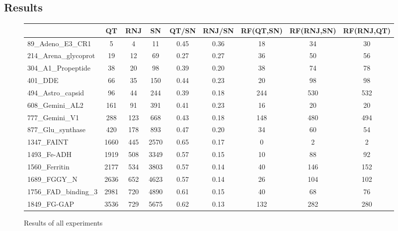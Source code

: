 \documentclass[a4paper,oneside,article,11pt]{memoir}
\begin{document}
\subsection*{Results }
\begin{figure}[H]
\begin{adjustwidth}{-2.3cm}{}
\begin{tabular}{l|c|c|c|c|c|c|c|c}
						& QT 	& RNJ 	& SN		& QT/SN 		& RNJ/SN & RF(QT,SN)	& RF(RNJ,SN) & RF(RNJ,QT) 	\\\hline
89\_Adeno\_E3\_CR1 		& 5 		& 4 		& 11   	& 0.45	 	& 0.36	 & 18		& 34			 & 30 			\\\hline
214\_Arena\_glycoprot 	& 19 	& 12 	& 69   	& 0.27 		& 0.27	 & 36		& 50			 & 56 			\\\hline
304\_A1\_Propeptide 		& 38 	& 20 	& 98   	& 0.39 		& 0.20	 & 38		& 74			 & 78 			\\\hline
401\_DDE 				& 66 	& 35 	& 150  	& 0.44 		& 0.23	 & 20		& 98			 & 98 			\\\hline
494\_Astro\_capsid 		& 96 	& 44 	& 244  	& 0.39 		& 0.18	 & 244		& 530		 & 532 			\\\hline
608\_Gemini\_AL2 		& 161 	& 91 	& 391  	& 0.41	 	& 0.23	 & 16		& 20			 & 20 			\\\hline
777\_Gemini\_V1 			& 288 	& 123 	& 668  	& 0.43 		& 0.18	 & 148		& 480		 & 494 			\\\hline
877\_Glu\_synthase 		& 420 	& 178 	& 893  	& 0.47 		& 0.20	 & 34		& 60			 & 54 			\\\hline
1347\_FAINT 				& 1660 	& 445	& 2570 	& 0.65 		& 0.17	 & 0			& 2			 & 2 			\\\hline
1493\_Fe-ADH 			& 1919 	& 508 	& 3349 	& 0.57 		& 0.15	 & 10		& 88			 & 92 			\\\hline
1560\_Ferritin 			& 2177 	& 534 	& 3803 	& 0.57 		& 0.14	 & 40		& 146		 & 152 			\\\hline
1689\_FGGY\_N 			& 2636 	& 652 	& 4623 	& 0.57 		& 0.14	 & 26		& 104		 & 102 			\\\hline
1756\_FAD\_binding\_3 	& 2981 	& 720 	& 4890 	& 0.61 		& 0.15	 & 40		& 68			 & 76 			\\\hline
1849\_FG-GAP 			& 3536 	& 729 	& 5675 	& 0.62 		& 0.13	 & 132		& 282		 & 280
\end{tabular}
\caption{\label{tab:results}Results of all experiments}
\end{adjustwidth}
\end{figure}


\end{document}
